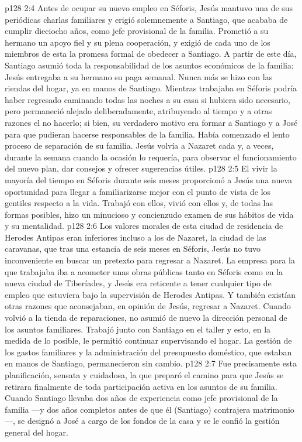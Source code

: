 \vs p128 2:4 \pc Antes de ocupar su nuevo empleo en Séforis, Jesús mantuvo una de sus periódicas charlas familiares y erigió solemnemente a Santiago, que acababa de cumplir dieciocho años, como jefe provisional de la familia. Prometió a su hermano un apoyo fiel y su plena cooperación, y exigió de cada uno de los miembros de esta la promesa formal de obedecer a Santiago. A partir de este día, Santiago asumió toda la responsabilidad de los asuntos económicos de la familia; Jesús entregaba a su hermano su paga semanal. Nunca más se hizo con las riendas del hogar, ya en manos de Santiago. Mientras trabajaba en Séforis podría haber regresado caminando todas las noches a su casa si hubiera sido necesario, pero permaneció alejado deliberadamente, atribuyendo al tiempo y a otras razones el no hacerlo; si bien, su verdadero motivo era formar a Santiago y a José para que pudieran hacerse responsables de la familia. Había comenzado el lento proceso de separación de su familia. Jesús volvía a Nazaret cada  y, a veces, durante la semana cuando la ocasión lo requería, para observar el funcionamiento del nuevo plan, dar consejos y ofrecer sugerencias útiles.
\vs p128 2:5 \pc El vivir la mayoría del tiempo en Séforis durante seis meses proporcionó a Jesús una nueva oportunidad para llegar a familiarizarse mejor con el punto de vista de los gentiles respecto a la vida. Trabajó con ellos, vivió con ellos y, de todas las formas posibles, hizo un minucioso y concienzudo examen de sus hábitos de vida y su mentalidad.
\vs p128 2:6 Los valores morales de esta ciudad de residencia de Herodes Antipas eran inferiores incluso a los de Nazaret, la ciudad de las caravanas, que tras una estancia de seis meses en Séforis, Jesús no tuvo inconveniente en buscar un pretexto para regresar a Nazaret. La empresa para la que trabajaba iba a acometer unas obras públicas tanto en Séforis como en la nueva ciudad de Tiberíades, y Jesús era reticente a tener cualquier tipo de empleo que estuviera bajo la supervisión de Herodes Antipas. Y también existían otras razones que aconsejaban, en opinión de Jesús, regresar a Nazaret. Cuando volvió a la tienda de reparaciones, no asumió de nuevo la dirección personal de los asuntos familiares. Trabajó junto con Santiago en el taller y esto, en la medida de lo posible, le permitió continuar supervisando el hogar. La gestión de los gastos familiares y la administración del presupuesto doméstico, que estaban en manos de Santiago, permanecieron sin cambio.
\vs p128 2:7 Fue precisamente esta planificación, sensata y cuidadosa, la que preparó el camino para que Jesús se retirara finalmente de toda participación activa en los asuntos de su familia. Cuando Santiago llevaba dos años de experiencia como jefe provisional de la familia ---y dos años completos antes de que él (Santiago) contrajera matrimonio---, se designó a José a cargo de los fondos de la casa y se le confió la gestión general del hogar.
